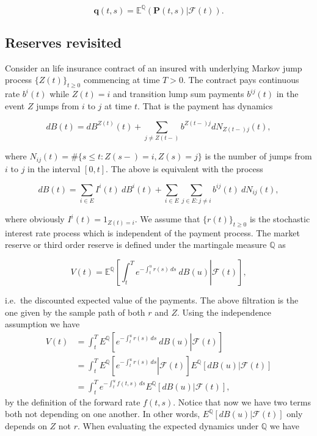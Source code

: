 \documentclass[a4paper,10pt,openany]{book}
\begin{document}
\[
\mathbf q(t,s) = \mathbb E^{\mathbb Q}\left(\left.\mathbf P(t,s)\right\vert \mathcal F (t)\right).
\]

\hypertarget{reserves-revisited}{%
\subsection{Reserves revisited}\label{reserves-revisited}}

Consider an life insurance contract of an insured with underlying Markov jump process \(\{Z(t)\}_{t\ge 0}\) commencing at time \(T>0\). The contract pays continuous rate \(b^i(t)\) while \(Z(t)= i\) and transition lump sum payments \(b^{ij}(t)\) in the event \(Z\) jumps from \(i\) to \(j\) at time \(t\). That is the payment has dynamics

\[
dB(t)=dB^{Z(t)}(t)+\sum_{j\ne Z(t-)}b^{Z(t-)j}dN_{Z(t-)j}(t),
\]

where \(N_{ij}(t)=\#\{s\le t:Z(s-)=i,Z(s)=j\}\) is the number of jumps from \(i\) to \(j\)
in the interval \([0,t]\). The above is equivalent with the process

\[
dB(t)=\sum_{i\in E}I^i(t)\ dB^i(t)+\sum_{i\in E}\sum_{j\in E : j\ne i}b^{ij}(t)\ dN_{ij}(t),
\]

where obviously \(I^i(t)=1_{Z(t)=i}\). We assume that \(\{r(t)\}_{t\ge 0}\) is the stochastic interest rate process which is independent of the payment process. The market reserve or third order reserve is defined under the martingale measure \(\mathbb Q\) as

\[
V(t)=\mathbb E^{\mathbb Q}\left[\left.\int_t^Te^{-\int_t^ur(s)\ ds}\ dB(u)\right\vert \mathcal F(t)\right],
\]

i.e.~the discounted expected value of the payments. The above filtration is the one given by the sample path of both \(r\) and \(Z\). Using the independence assumption we have
\begin{align*}
V(t)&=\int_t^TE^{\mathbb Q}\left[\left.e^{-\int_t^ur(s)\ ds}\ dB(u)\right\vert \mathcal F(t)\right]\\
&=\int_t^TE^{\mathbb Q}\left[\left.e^{-\int_t^ur(s)\ ds}\right\vert \mathcal F(t)\right]E^{\mathbb Q}\left[\left.dB(u)\right\vert \mathcal F(t)\right]\\
&=\int_t^Te^{-\int_t^uf(t,s)\ ds}E^{\mathbb Q}\left[\left.dB(u)\right\vert \mathcal F(t)\right],
\end{align*}
by the definition of the forward rate \(f(t,s)\). Notice that now we have two terms both not depending on one another. In other words, \(E^{\mathbb Q}\left[\left.dB(u)\right\vert \mathcal F(t)\right]\) only depends on \(Z\) not \(r\). When evaluating the expected dynamics under \(\mathbb Q\) we have
\end{document}
